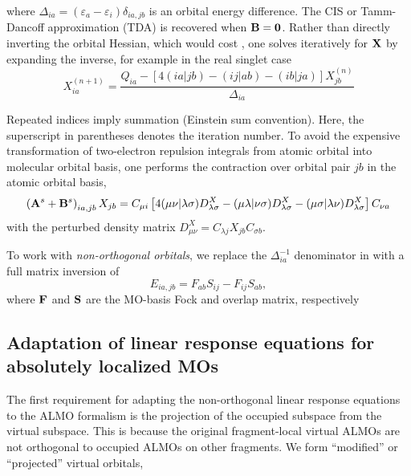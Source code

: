 \documentclass[%
  class = book,%
  crop = false,%
  float = true,%
  multi = true,%
  preview = false,%
]{standalone}
\begin{document}
where \(\Delta_{ia} = (\varepsilon_{a} - \varepsilon_{i}) \delta_{ia,jb}\) is an orbital energy difference. The CIS or Tamm-Dancoff approximation (TDA) is recovered when \(\mathbf{B} = \mathbf{0}\). Rather than directly inverting the orbital Hessian, which would cost , one solves iteratively for \(\mathbf{X}\) by expanding the inverse, for example in the real singlet case
\begin{equation}
  \label{eq:update}
  X_{ia}^{(n+1)}
  =
  \frac{Q_{ia} - \left[4(ia|jb) - (ij|ab) - (ib|ja)\right] X_{jb}^{(n)}}
       {\Delta_{ia}}
\end{equation}

Repeated indices imply summation (Einstein sum convention). Here, the superscript in parentheses denotes the iteration number. To avoid the expensive transformation of two-electron repulsion integrals from atomic orbital into molecular orbital basis, one performs the contraction over orbital pair \(jb\) in the atomic orbital basis,
\begin{equation}
  \left(\mathbf{A}^{s} + \mathbf{B}^{s}\right)_{ia,jb} X_{jb}
  =
  C_{\mu i}
  \left[
    4 (\mu\nu|\lambda\sigma) D_{\lambda\sigma}^{X}
    - (\mu\lambda|\nu\sigma) D_{\lambda\sigma}^{X}
    - (\mu\sigma|\lambda\nu) D_{\lambda\sigma}^{X}
  \right]
  C_{\nu a}
\end{equation}
with the perturbed density matrix \(D_{\mu\nu}^{X} = C_{\lambda j} X_{jb} C_{\sigma b}\).

To work with \emph{non-orthogonal orbitals}, we replace the \(\Delta_{ia}^{-1}\) denominator in  with a full matrix inversion of
\begin{equation}
  \label{eq:energy-denominator}
  E_{ia,jb} = F_{ab}S_{ij} - F_{ij}S_{ab},
\end{equation}
where \(\mathbf{F}\) and \(\mathbf{S}\) are the MO-basis Fock and overlap matrix, respectively

\subsection{Adaptation of linear response equations for absolutely localized MOs}
\label{ssec:almo-adaptation}

The first requirement for adapting the non-orthogonal linear response equations to the ALMO formalism is the projection of the occupied subspace from the virtual subspace. This is because the original fragment-local virtual ALMOs are not orthogonal to occupied ALMOs on other fragments. We form ``modified'' or ``projected'' virtual orbitals,
\end{document}

